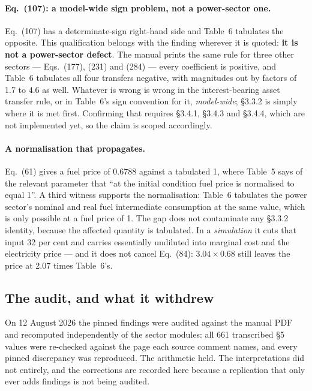 \paragraph{Eq.~(107): a model-wide sign problem, not a power-sector one.} Eq.~(107) has a determinate-sign right-hand side and Table~6 tabulates the opposite. This qualification belongs with the finding wherever it is quoted: \textbf{it is not a power-sector defect}. The manual prints the same rule for three other sectors --- Eqs.~(177), (231) and (284) --- every coefficient is positive, and Table~6 tabulates all four transfers negative, with magnitudes out by factors of 1.7 to 4.6 as well. Whatever is wrong is wrong in the interest-bearing asset transfer rule, or in Table~6's sign convention for it, \emph{model-wide}; \S3.3.2 is simply where it is met first. Confirming that requires \S3.4.1, \S3.4.3 and \S3.4.4, which are not implemented yet, so the claim is scoped accordingly.

\paragraph{A normalisation that propagates.} Eq.~(61) gives a fuel price of 0.6788 against a tabulated 1, where Table~5 says of the relevant parameter that ``at the initial condition fuel price is normalised to equal 1''. A third witness supports the normalisation: Table~6 tabulates the power sector's nominal and real fuel intermediate consumption at the same value, which is only possible at a fuel price of 1. The gap does not contaminate any \S3.3.2 identity, because the affected quantity is tabulated. In a \emph{simulation} it cuts that input 32 per cent and carries essentially undiluted into marginal cost and the electricity price --- and it does not cancel Eq.~(84): $3.04 \times 0.68$ still leaves the price at 2.07 times Table~6's.

\subsection{The audit, and what it withdrew}
\label{sec:audit}

On 12 August 2026 the pinned findings were audited against the manual PDF and recomputed independently of the sector modules: all 661 transcribed \S5 values were re-checked against the page each source comment names, and every pinned discrepancy was reproduced. The arithmetic held. The interpretations did not entirely, and the corrections are recorded here because a replication that only ever adds findings is not being audited.

